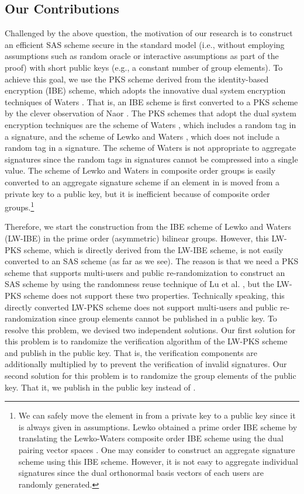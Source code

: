 \documentclass[11pt,letterpaper]{article}
\begin{document}
\subsection{Our Contributions}

Challenged by the above question, the motivation of our research is to
construct an efficient SAS scheme secure in the standard model (i.e., without
employing assumptions such as random oracle or interactive assumptions as
part of the proof) with short public keys (e.g., a constant number of group
elements). To achieve this goal, we use the PKS scheme derived from the
identity-based encryption (IBE) scheme, which adopts the innovative dual
system encryption techniques of Waters \cite{Waters09,LewkoW10}. That is, an
IBE scheme is first converted to a PKS scheme by the clever observation of
Naor \cite{BonehF01}. The PKS schemes that adopt the dual system encryption
techniques are the scheme of Waters \cite{Waters09}, which includes a random
tag in a signature, and the scheme of Lewko and Waters \cite{LewkoW10}, which
does not include a random tag in a signature. The scheme of Waters is not
appropriate to aggregate signatures since the random tags in signatures
cannot be compressed into a single value. The scheme of Lewko and Waters in
composite order groups is easily converted to an aggregate signature scheme
if an element in  is moved from a private key to a public key, but
it is inefficient because of composite order groups.\footnote{We can safely
move the element in  from a private key to a public key since it is
always given in assumptions. Lewko obtained a prime order IBE scheme by
translating the Lewko-Waters composite order IBE scheme using the dual
pairing vector spaces \cite{Lewko12}. One may consider to construct an
aggregate signature scheme using this IBE scheme. However, it is not easy to
aggregate individual signatures since the dual orthonormal basis vectors of
each users are randomly generated.}

Therefore, we start the construction from the IBE scheme of Lewko and Waters
(LW-IBE) \cite{LewkoW10} in the prime order (asymmetric) bilinear groups.
However, this LW-PKS scheme, which is directly derived from the LW-IBE
scheme, is not easily converted to an SAS scheme (as far as we see). The
reason is that we need a PKS scheme that supports multi-users and public
re-randomization to construct an SAS scheme by using the randomness reuse
technique of Lu et al. \cite{LuOSSW06}, but the LW-PKS scheme does not
support these two properties. Technically speaking, this directly converted
LW-PKS scheme does not support multi-users and public re-randomization since
group elements  cannot be published in a public key. To
resolve this problem, we devised two independent solutions. Our first
solution for this problem is to randomize the verification algorithm of the
LW-PKS scheme and publish  in the public key. That is, the
verification components are additionally multiplied by  to prevent the verification of invalid
signatures. Our second solution for this problem is to randomize the group
elements of the public key. That it, we publish  in the public key instead of .
\end{document}
